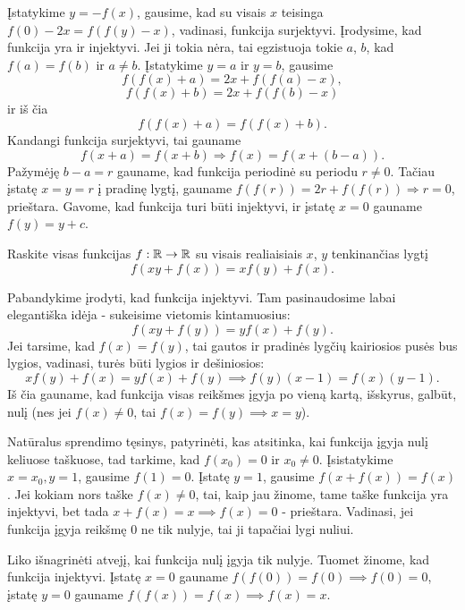 \begin{sprendimas}
  Įstatykime $y = -f(x)$, gausime, kad su visais $x$ teisinga $f(0) - 2x =
  f(f(y)-x)$, vadinasi, funkcija surjektyvi.  Įrodysime, kad funkcija
  yra ir injektyvi. Jei ji tokia nėra, tai egzistuoja tokie $a$, $b$,
  kad $f(a)=f(b)$ ir $a\neq b$. Įstatykime $y=a$ ir $y=b$, gausime
  $$f(f(x)+a) = 2x +f(f(a)-x),$$ $$f(f(x)+b) = 2x +f(f(b)-x)$$ ir iš čia
  $$f(f(x)+a)=f(f(x)+b).$$ Kandangi funkcija surjektyvi, tai gauname
  $$f(x+a)=f(x+b) \Rightarrow f(x)=f(x+(b-a)).$$ Pažymėję $b-a=r$
  gauname, kad funkcija periodinė su periodu $r \neq 0$. Tačiau įstatę
  $x=y=r$ į pradinę lygtį, gauname $f(f(r))=2r + f(f(r)) \Rightarrow r =
  0$, prieštara.  Gavome, kad funkcija turi būti injektyvi, ir įstatę $x
  = 0$ gauname $f(y) = y + c$.
\end{sprendimas}

\begin{pavnr} Raskite visas funkcijas $f: \mathbb R \to \mathbb R$ su visais
  realiaisiais $x$, $y$ tenkinančias lygtį $$f(xy+f(x))=xf(y)+f(x).$$
\end{pavnr}

\begin{sprendimas}
  Pabandykime įrodyti, kad funkcija injektyvi. Tam pasinaudosime labai
  elegantiška idėja - sukeisime vietomis kintamuosius:
  $$f(xy+f(y)) = yf(x) + f(y).$$
  Jei tarsime, kad $f(x)=f(y)$, tai gautos ir pradinės lygčių kairiosios
  pusės bus lygios, vadinasi, turės būti lygios ir dešiniosios: 
  $$xf(y) + f(x) = yf(x) + f(y) \implies f(y)(x-1)=f(x)(y-1).$$ 
  Iš čia gauname, kad funkcija visas reikšmes įgyja po vieną kartą,
  išskyrus, galbūt, nulį (nes jei $f(x)\neq 0$, tai $f(x)=f(y)\implies
  x=y$). 
  
  Natūralus sprendimo tęsinys, patyrinėti, kas atsitinka, kai funkcija
  įgyja nulį keliuose taškuose, tad tarkime, kad $f(x_0) = 0$ ir $x_0 \neq
  0$.  Įsistatykime $x=x_0, y=1$, gausime $f(1)=0$. Įstatę $y=1$, gausime
  $f(x+f(x))=f(x)$. Jei kokiam nors taške $f(x)\neq 0$, tai, kaip jau
  žinome, tame taške funkcija yra injektyvi, bet tada $x + f(x) = x \implies f(x)=0$ -
  prieštara. Vadinasi, jei funkcija įgyja reikšmę $0$ ne tik nulyje, tai ji
  tapačiai lygi nuliui.  
  
  Liko išnagrinėti atvejį, kai funkcija nulį įgyja tik nulyje. Tuomet
  žinome, kad funkcija injektyvi. Įstatę $x=0$ gauname $f(f(0))=f(0)
  \implies f(0)=0$, įstatę $y=0$ gauname $f(f(x))=f(x) \implies f(x)=x$.
\end{sprendimas}
 
